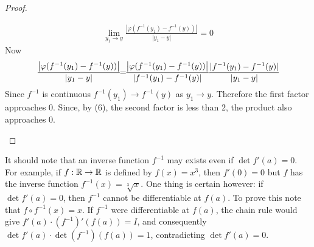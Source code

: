\begin{proof}
\begin{enumerate}[label={\upshape(\arabic*)}]
\begin{align*}
                \lim_{y_1\to y}\frac{\left|\varphi(f^{-1}(y_1)-f^{-1}(y))\right|}{|y_1-y|}=0
            \end{align*}
            Now 
            \begin{align*}
                \frac{\left|\varphi(f^{-1}(y_1)-f^{-1}(y))\right|}{|y_1-y|}
                \hspace*{-4pt}=\hspace*{-4pt} 
                \frac{\left|\varphi(f^{-1}(y_1)-f^{-1}(y))\right|}{|f^{-1}(y_1) - f^{-1}(y)|}
                \hspace*{-4pt}\cdot\hspace*{-4pt} 
                \frac{|f^{-1}(y_1) - f^{-1}(y)|}{|y_1-y|} 
            \end{align*}
            Since $f^{-1}$ is continuous $f^{-1}(y_1) \to f^{-1}(y)$ as $y_1\to y$. Therefore 
            the first factor approaches 0. Since, by (6), the second factor is less than 2, 
            the product also approaches 0.
    \end{enumerate}
\end{proof}

It should note that an inverse function $f^{-1}$ may exists even if $\det f'(a) = 0$. 
For example, if $f:\mathbb{R}\to \mathbb{R}$ is defined by $f(x) = x^3$, then $f'(0) = 0$ but $f$
has the inverse function $f^{-1}(x) = \sqrt[3]{x}$. One thing is certain however: if 
$\det f'(a) = 0$, then $f^{-1}$ cannot be differentiable at $f(a)$. To prove this note 
that $f\circ f^{-1}(x) = x$. If $f^{-1}$ were differentiable at $f(a)$, the chain rule 
would give $f'(a)\cdot (f^{-1})'(f(a)) = I$, and consequently $\det f'(a)\cdot \det(f^{-1})(f(a)) = 1$,
contradicting $\det f'(a) = 0$.

